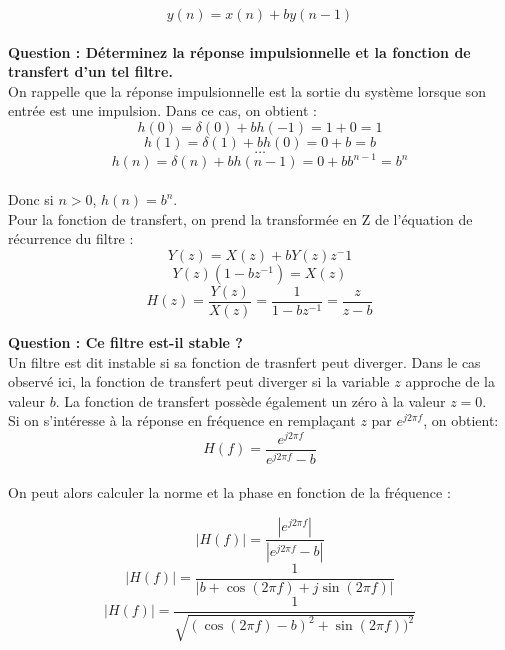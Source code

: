 \documentclass[11pt,a4paper]{article}
\begin{document}
\[ y(n) =  x(n) + b y(n-1)\]\\

\textbf{ Question : Déterminez la réponse impulsionnelle et la fonction de transfert d'un tel filtre.}\\

On rappelle que la réponse impulsionnelle est la sortie du système lorsque son entrée est une impulsion. Dans ce cas, on obtient : \\
\[ h(0) = \delta(0) + b h(-1) = 1 + 0 = 1\]
\[ h(1) = \delta(1) + b h(0) = 0 + b  = b \]
\[ \ldots \]
\[ h(n) = \delta(n) + b h(n-1) = 0 + b b^{n-1} = b^{n}\]\\

Donc si $n > 0$, $h(n) = b^{n}$.\\

Pour la fonction de transfert, on prend la transformée en Z de l'équation de récurrence du filtre : \\

\[ Y(z)  = X(z) + b Y(z) z^-1 \] 
\[ Y(z) (1 -bz^{-1}) =  X(z)  \]
\[ H(z) = \frac{Y(z)}{X(z)} = \frac{1}{1 - b z^{-1}} = \frac{z}{z-b} \]

\textbf{ Question : Ce filtre est-il stable ? }\\

Un filtre est dit instable si sa fonction de trasnfert peut diverger. Dans le cas observé ici, la fonction de transfert peut diverger si la variable $z$ approche de la valeur $b$. La fonction de transfert possède également un zéro à la valeur $z = 0$.\\

Si on s'intéresse à la réponse en fréquence en remplaçant $z$ par $e^{j 2 \pi f}$, on obtient: \\

\[ H(f) =  \frac{e^{j2 \pi f}}{e^{j 2 \pi f}-b} \]\\

On peut alors calculer la norme et la phase en fonction de la fréquence : 

\[ |H(f)| = \frac{|e^{j2 \pi f}|}{|e^{j 2 \pi f}-b|} \]
\[ |H(f)| = \frac{1}{|b + \cos(2 \pi f) + j \sin(2 \pi f)|} \]
\[ |H(f)| = \frac{1}{\sqrt{(\cos(2 \pi f) - b)^2 +  \sin(2 \pi f))^2}} \]
\end{document}
